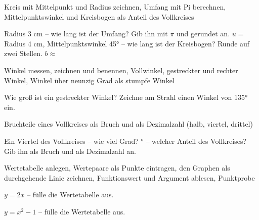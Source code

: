 \begin{aufgabe}{Kreis mit Mittelpunkt und Radius zeichnen, Umfang mit Pi berechnen, Mittelpunktswinkel und Kreisbogen als Anteil des Vollkreises}
\begin{teile}
\teil Radius 3 cm – wie lang ist der Umfang? Gib ihn mit $\pi$ und gerundet an. $u = $ \leerfeld[cm]
\teil Radius 4 cm, Mittelpunktswinkel 45° – wie lang ist der Kreisbogen? Runde auf zwei Stellen. $b \approx$ \leerfeld[cm]
\end{teile}
\end{aufgabe}

\begin{aufgabe}{Winkel messen, zeichnen und benennen, Vollwinkel, gestreckter und rechter Winkel, Winkel über neunzig Grad als stumpfe Winkel}
\begin{teile}
\teil Wie groß ist ein gestreckter Winkel? \leerfeld[°]
\teil Zeichne am Strahl einen Winkel von 135° ein.

\winkelstrahl
\end{teile}
\end{aufgabe}

\begin{aufgabe}{Bruchteile eines Vollkreises als Bruch und als Dezimalzahl (halb, viertel, drittel)}
\begin{teile}
\teil Ein Viertel des Vollkreises – wie viel Grad? \leerfeld[°]
° – welcher Anteil des Vollkreises? Gib ihn als Bruch und als Dezimalzahl an. \leerfeld
\end{teile}
\end{aufgabe}

\begin{aufgabe}{Wertetabelle anlegen, Wertepaare als Punkte eintragen, den Graphen als durchgehende Linie zeichnen, Funktionswert und Argument ablesen, Punktprobe}
\begin{teile}
\teil $y = 2x$ – fülle die Wertetabelle aus.

\teil $y = x^2 - 1$ – fülle die Wertetabelle aus.

\end{teile}
\end{aufgabe}

